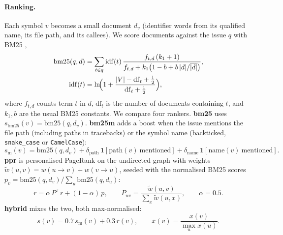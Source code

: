 \documentclass[10pt]{article}
\newcommand{\ind}[1]{\mathbf{1}\!\left[#1\right]}
\begin{document}
\paragraph{Ranking.} Each symbol $v$ becomes a small document $d_v$ (identifier words from its qualified name, its file path, and its callees). We score documents against the issue $q$ with BM25 \cite{bm25},
\begin{align}
\mathrm{bm25}(q,d)&=\sum_{t\in q}\mathrm{idf}(t)\,\frac{f_{t,d}\,(k_1+1)}{f_{t,d}+k_1\bigl(1-b+b\,|d|/\overline{|d|}\bigr)},\label{eq:bm25}\\
\mathrm{idf}(t)&=\ln\!\Bigl(1+\frac{|V|-\mathrm{df}_t+\tfrac12}{\mathrm{df}_t+\tfrac12}\Bigr),\notag
\end{align}
where $f_{t,d}$ counts term $t$ in $d$, $\mathrm{df}_t$ is the number of documents containing $t$, and $k_1,b$ are the usual BM25 constants. We compare four rankers. \textbf{bm25} uses $s_{\mathrm{bm25}}(v)=\mathrm{bm25}(q,d_v)$. \textbf{bm25m} adds a boost when the issue mentions the file path (including paths in tracebacks) or the symbol name (backticked, \texttt{snake\_case} or \texttt{CamelCase}):
\begin{equation}\label{eq:bm25m}
s_{\mathrm m}(v)=\mathrm{bm25}(q,d_v)+\delta_{\mathrm{path}}\,\ind{\mathrm{path}(v)\ \text{mentioned}}+\delta_{\mathrm{name}}\,\ind{\mathrm{name}(v)\ \text{mentioned}}.
\end{equation}
\textbf{ppr} is personalised PageRank \cite{pagerank} on the undirected graph with weights $\tilde w(u,v)=w(u\to v)+w(v\to u)$, seeded with the normalised BM25 scores $p_v=\mathrm{bm25}(q,d_v)/\sum_{u}\mathrm{bm25}(q,d_u)$:
\begin{equation}\label{eq:ppr}
r=\alpha\,P^{\top}r+(1-\alpha)\,p,\qquad P_{uv}=\frac{\tilde w(u,v)}{\sum_{x}\tilde w(u,x)},\qquad \alpha=0.5.
\end{equation}
\textbf{hybrid} mixes the two, both max-normalised:
\begin{equation}\label{eq:hybrid}
s(v)=0.7\,\bar s_{\mathrm m}(v)+0.3\,\bar r(v),\qquad \bar x(v)=\frac{x(v)}{\max_{u}x(u)}.
\end{equation}
\end{document}
